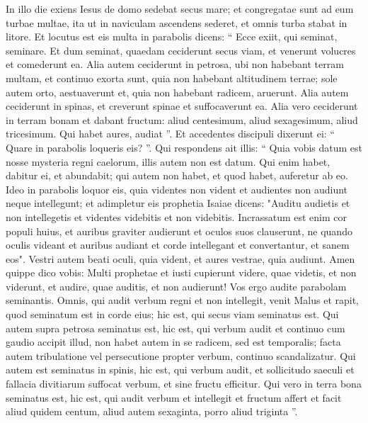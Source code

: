 \begin{biblechapter}
\begin{biblechapter}
\begin{biblechapter}
\begin{biblechapter}
\begin{biblechapter}
\begin{biblechapter}
\begin{biblechapter}
\begin{biblechapter}
\begin{biblechapter}
\begin{biblechapter}
\begin{biblechapter}
\begin{biblechapter}
\begin{biblechapter}
\verse In illo die exiens Iesus de domo sedebat secus mare; 
\verse et congregatae sunt ad eum turbae multae, ita ut in naviculam ascendens sederet, et omnis turba stabat in litore.
 \verse Et locutus est eis multa in parabolis dicens: “ Ecce exiit, qui seminat, seminare. 
\verse Et dum seminat, quaedam ceciderunt secus viam, et venerunt volucres et comederunt ea. 
\verse Alia autem ceciderunt in petrosa, ubi non habebant terram multam, et continuo exorta sunt, quia non habebant altitudinem terrae; 
\verse sole autem orto, aestuaverunt et, quia non habebant radicem, aruerunt. 
\verse Alia autem ceciderunt in spinas, et creverunt spinae et suffocaverunt ea. 
\verse Alia vero ceciderunt in terram bonam et dabant fructum: aliud centesimum, aliud sexagesimum, aliud tricesimum. 
\verse Qui habet aures, audiat ”. 
\verse Et accedentes discipuli dixerunt ei: “ Quare in parabolis loqueris eis? ”. 
\verse Qui respondens ait illis: “ Quia vobis datum est nosse mysteria regni caelorum, illis autem non est datum. 
\verse Qui enim habet, dabitur ei, et abundabit; qui autem non habet, et quod habet, auferetur ab eo. 
 \verse Ideo in parabolis loquor eis, quia videntes non vident et audientes non audiunt neque intellegunt; 
\verse et adimpletur eis prophetia Isaiae dicens:
 "Auditu audietis et non intellegetis
 et videntes videbitis et non videbitis.
 \verse Incrassatum est enim cor populi huius,
 et auribus graviter audierunt
 et oculos suos clauserunt,
 ne quando oculis videant
 et auribus audiant
 et corde intellegant et convertantur,
 et sanem eos".
 \verse Vestri autem beati oculi, quia vident, et aures vestrae, quia audiunt. 
\verse Amen quippe dico vobis: Multi prophetae et iusti cupierunt videre, quae videtis, et non viderunt, et audire, quae auditis, et non audierunt!
 \verse Vos ergo audite parabolam seminantis. 
\verse Omnis, qui audit verbum regni et non intellegit, venit Malus et rapit, quod seminatum est in corde eius; hic est, qui secus viam seminatus est. 
\verse Qui autem supra petrosa seminatus est, hic est, qui verbum audit et continuo cum gaudio accipit illud, 
\verse non habet autem in se radicem, sed est temporalis; facta autem tribulatione vel persecutione propter verbum, continuo scandalizatur. 
\verse Qui autem est seminatus in spinis, hic est, qui verbum audit, et sollicitudo saeculi et fallacia divitiarum suffocat verbum, et sine fructu efficitur. 
\verse Qui vero in terra bona seminatus est, hic est, qui audit verbum et intellegit et fructum affert et facit aliud quidem centum, aliud autem sexaginta, porro aliud triginta ”.

\end{biblechapter}
\end{biblechapter}
\end{biblechapter}
\end{biblechapter}
\end{biblechapter}
\end{biblechapter}
\end{biblechapter}
\end{biblechapter}
\end{biblechapter}
\end{biblechapter}
\end{biblechapter}
\end{biblechapter}
\end{biblechapter}
